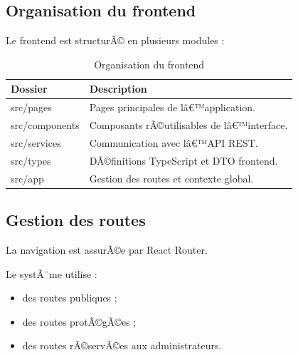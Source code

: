 ﻿\documentclass[12pt,a4paper]{report}
\begin{document}
\subsection{Organisation du frontend}

Le frontend est structurÃ© en plusieurs modules :

\begin{table}[H]
    \centering
    \caption{Organisation du frontend}

    \begin{tabular}{|p{4cm}|p{9cm}|}
        \hline
        \textbf{Dossier} & \textbf{Description} \\
        \hline

        src/pages &
        Pages principales de lâ€™application. \\
        
        \hline

        src/components &
        Composants rÃ©utilisables de lâ€™interface. \\
        
        \hline

        src/services &
        Communication avec lâ€™API REST. \\
        
        \hline

        src/types &
        DÃ©finitions TypeScript et DTO frontend. \\
        
        \hline

        src/app &
        Gestion des routes et contexte global. \\
        
        \hline
    \end{tabular}
\end{table}

\subsection{Gestion des routes}

La navigation est assurÃ©e par React Router.

Le systÃ¨me utilise :
\begin{itemize}
    \item des routes publiques ;
    \item des routes protÃ©gÃ©es ;
    \item des routes rÃ©servÃ©es aux administrateurs.
\end{itemize}
\end{document}
